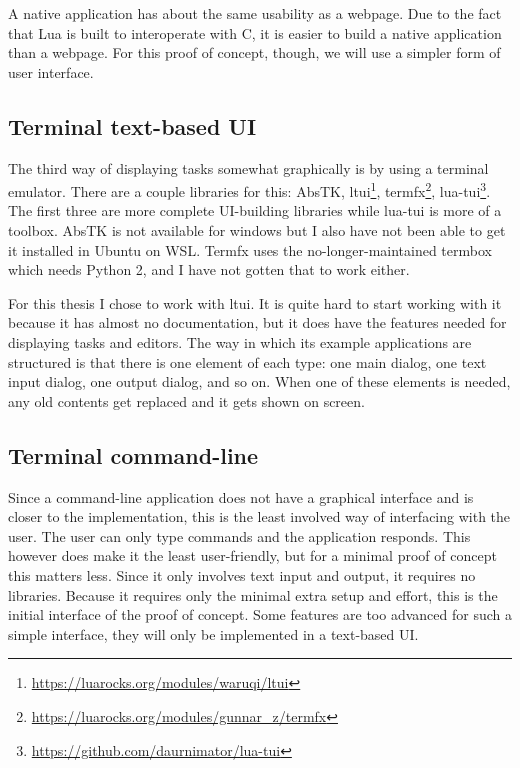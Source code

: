 A native application has about the same usability as a webpage. Due to the fact that Lua is built to interoperate with C, it is easier to build a native application than a webpage. For this proof of concept, though, we will use a simpler form of user interface.

\subsection{Terminal text-based UI}
The third way of displaying tasks somewhat graphically is by using a terminal emulator. There are a couple libraries for this:
AbsTK,
ltui\footnote{\url{https://luarocks.org/modules/waruqi/ltui}},
termfx\footnote{\url{https://luarocks.org/modules/gunnar_z/termfx}},
lua-tui\footnote{\url{https://github.com/daurnimator/lua-tui}}. The first three are more complete UI-building libraries while lua-tui is more of a toolbox. AbsTK is not available for windows but I also have not been able to get it installed in Ubuntu on WSL. Termfx uses the no-longer-maintained termbox which needs Python 2, and I have not gotten that to work either.

For this thesis I chose to work with ltui. It is quite hard to start working with it because it has almost no documentation, but it does have the features needed for displaying tasks and editors. The way in which its example applications are structured is that there is one element of each type: one main dialog, one text input dialog, one output dialog, and so on. When one of these elements is needed, any old contents get replaced and it gets shown on screen.

\subsection{Terminal command-line}
Since a command-line application does not have a graphical interface and is closer to the implementation, this is the least involved way of interfacing with the user. The user can only type commands and the application responds. This however does make it the least user-friendly, but for a minimal proof of concept this matters less. Since it only involves text input and output, it requires no libraries. Because it requires only the minimal extra setup and effort, this is the initial interface of the proof of concept. Some features are too advanced for such a simple interface, they will only be implemented in a text-based UI.

